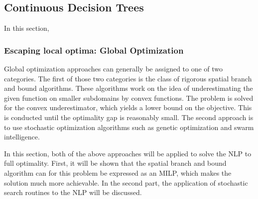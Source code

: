 \subsection{Continuous Decision Trees}
In this section, 
\subsubsection{Escaping local optima: Global Optimization}
\label{sec:nlp-formulation2}
Global optimization approaches can generally be assigned to one of two categories. The first of those two categories is the class of rigorous spatial branch and bound algorithms. These algorithms work on the idea of underestimating the given function on smaller subdomains by convex functions. The problem is solved for the convex underestimator, which yields a lower bound on the objective. This is conducted until the optimality gap is reasonably small. The second approach is to use stochastic optimization algorithms such as genetic optimization and swarm intelligence.

In this section, both of the above approaches will be applied to solve the NLP to full optimality. First, it will be shown that the spatial branch and bound algorithm can for this problem be expressed as an MILP, which makes the solution much more achievable. In the second part, the application of stochastic search routines to the NLP will be discussed.

